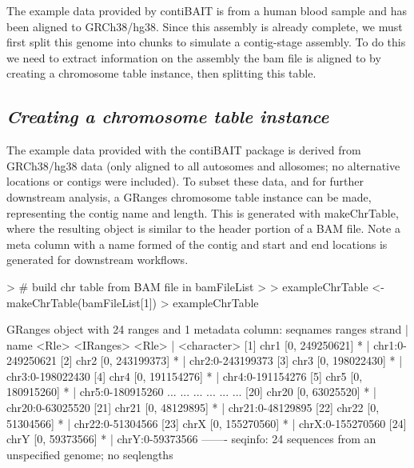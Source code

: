 \documentclass{article}
\begin{document}
\begin{Schunk}
\end{Schunk}

The example data provided by contiBAIT is from a human blood sample and has been aligned to GRCh38/hg38.  Since this assembly is already complete, we must first split this genome into chunks to simulate a contig-stage assembly. To do this we need to extract information on the assembly the bam file is aligned to by creating a chromosome table instance, then splitting this table.

\subsection{\textit{Creating a chromosome table instance}}

The example data provided with the contiBAIT package is derived from GRCh38/hg38 data (only aligned to all autosomes and allosomes; no alternative locations or contigs were included). To subset these data, and for further downstream analysis, a GRanges chromosome table instance can be made, representing the contig name and length. This is generated with makeChrTable, where the resulting object is similar to the header portion of a BAM file. Note a meta column with a name formed of the contig and start and end locations is generated for downstream workflows.

\begin{Schunk}
\begin{Sinput}
> # build chr table from BAM file in bamFileList
> 
> exampleChrTable <- makeChrTable(bamFileList[1]) 
> exampleChrTable
\end{Sinput}
\begin{Soutput}
GRanges object with 24 ranges and 1 metadata column:
       seqnames         ranges strand   |             name
          <Rle>      <IRanges>  <Rle>   |      <character>
   [1]     chr1 [0, 249250621]      *   | chr1:0-249250621
   [2]     chr2 [0, 243199373]      *   | chr2:0-243199373
   [3]     chr3 [0, 198022430]      *   | chr3:0-198022430
   [4]     chr4 [0, 191154276]      *   | chr4:0-191154276
   [5]     chr5 [0, 180915260]      *   | chr5:0-180915260
   ...      ...            ...    ... ...              ...
  [20]    chr20 [0,  63025520]      *   | chr20:0-63025520
  [21]    chr21 [0,  48129895]      *   | chr21:0-48129895
  [22]    chr22 [0,  51304566]      *   | chr22:0-51304566
  [23]     chrX [0, 155270560]      *   | chrX:0-155270560
  [24]     chrY [0,  59373566]      *   |  chrY:0-59373566
  -------
  seqinfo: 24 sequences from an unspecified genome; no seqlengths
\end{Soutput}
\end{Schunk}
\end{document}
